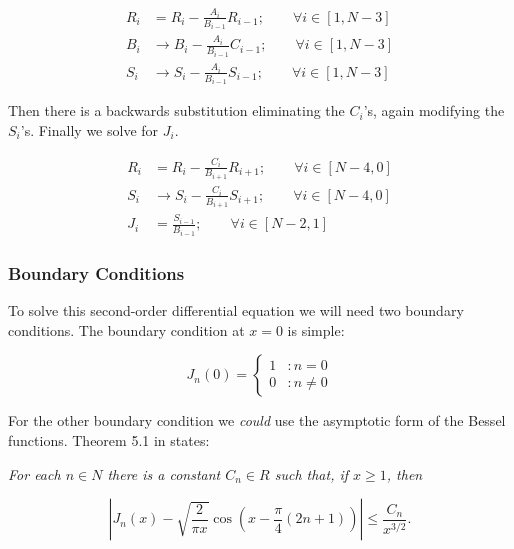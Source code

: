 \documentclass[onecolumn, groupedaddress, 10pt]{revtex4-1}
\begin{document}
\begin{align}
R_i &=   R_i - \frac{A_i}{B_{i-1}} R_{i-1}; 	\qquad \forall i \in [1, N-3]		\\
B_i &\to B_i - \frac{A_i}{B_{i-1}} C_{i-1}; 	\qquad \forall i \in [1, N-3]		\\
S_i &\to S_i - \frac{A_i}{B_{i-1}} S_{i-1}; 	\qquad \forall i \in [1, N-3]
\end{align}

Then there is a backwards substitution eliminating the $C_i$'s, again modifying the $S_i$'s.  Finally we solve for $J_i$.

\begin{align}
R_i &=   R_i - \frac{C_i}{B_{i+1}} R_{i+1}; \qquad \forall i \in [N-4, 0]	\\
S_i &\to S_i - \frac{C_i}{B_{i+1}} S_{i+1}; \qquad \forall i \in [N-4, 0]	\\
J_i &=   \frac{S_{i-1}}{B_{i-1}};           \qquad \forall i \in [N-2, 1]
\end{align}




\subsubsection{Boundary Conditions \label{sec:boundaryConditions}}

To solve this second-order differential equation we will need two boundary conditions.  The boundary condition at $x=0$ is simple:

\begin{displaymath}
   J_n(0) = \left\{
     \begin{array}{lr}
       1 & : n = 0     \\
       0 & : n \neq 0
     \end{array}
   \right.
\end{displaymath}

For the other boundary condition we \textit{could} use the asymptotic form of the Bessel functions.  Theorem 5.1 in \cite{folland} states:

\textit{For each $n \in N$ there is a constant $C_n \in R$ such that, if $x \geq 1$, then}

\begin{equation}
\label{eqn:asymtoticBessel}
\left| J_n(x) - \sqrt{\frac{2}{\pi x}} \cos \left( x - \frac{\pi}{4} (2n+1) \right) \right| \leq \frac{C_n}{x^{3/2}}.
\end{equation}
\end{document}
